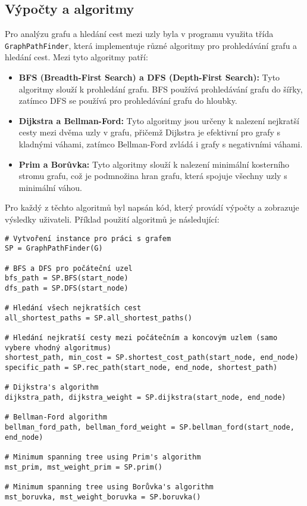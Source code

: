 \subsection{Výpočty a algoritmy}
Pro analýzu grafu a hledání cest mezi uzly byla v programu využita třída \texttt{GraphPathFinder}, která implementuje různé algoritmy pro prohledávání grafu a hledání cest. Mezi tyto algoritmy patří:

\begin{itemize}
    \item \textbf{BFS (Breadth-First Search) a DFS (Depth-First Search):} Tyto algoritmy slouží k prohledání grafu. BFS používá prohledávání grafu do šířky, zatímco DFS se používá pro prohledávání grafu do hloubky.
    \item \textbf{Dijkstra a Bellman-Ford:} Tyto algoritmy jsou určeny k nalezení nejkratší cesty mezi dvěma uzly v grafu, přičemž Dijkstra je efektivní pro grafy s kladnými váhami, zatímco Bellman-Ford zvládá i grafy s negativními váhami.
    \item \textbf{Prim a Borůvka:} Tyto algoritmy slouží k nalezení minimální kosterního stromu grafu, což je podmnožina hran grafu, která spojuje všechny uzly s minimální váhou.
\end{itemize}

Pro každý z těchto algoritmů byl napsán kód, který provádí výpočty a zobrazuje výsledky uživateli. Příklad použití algoritmů je následující:

\begin{verbatim}
# Vytvoření instance pro práci s grafem
SP = GraphPathFinder(G)

# BFS a DFS pro počáteční uzel
bfs_path = SP.BFS(start_node)
dfs_path = SP.DFS(start_node)

# Hledání všech nejkratších cest
all_shortest_paths = SP.all_shortest_paths()

# Hledání nejkratší cesty mezi počátečním a koncovým uzlem (samo vybere vhodný algoritmus)
shortest_path, min_cost = SP.shortest_cost_path(start_node, end_node)
specific_path = SP.rec_path(start_node, end_node, shortest_path)

# Dijkstra's algorithm
dijkstra_path, dijkstra_weight = SP.dijkstra(start_node, end_node)

# Bellman-Ford algorithm
bellman_ford_path, bellman_ford_weight = SP.bellman_ford(start_node, end_node)

# Minimum spanning tree using Prim's algorithm
mst_prim, mst_weight_prim = SP.prim()

# Minimum spanning tree using Borůvka's algorithm
mst_boruvka, mst_weight_boruvka = SP.boruvka()
\end{verbatim}

